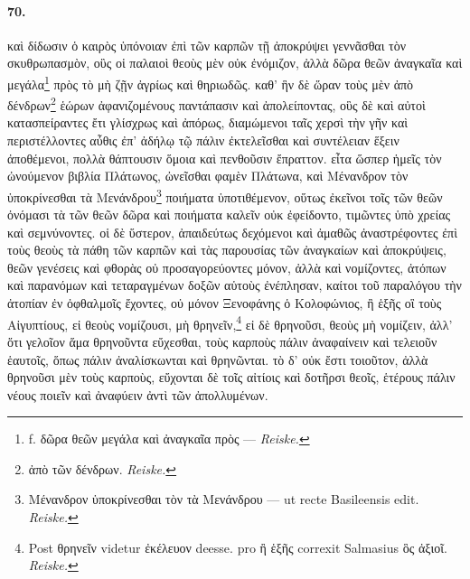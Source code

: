 \documentclass[a4paper, 11pt, oneside, polutonikogreek, german, landscape]{article}
\begin{document}
\paragraph{70.}
καὶ δίδωσιν ὁ καιρὸς ὑπόνοιαν ἐπὶ τῶν καρπῶν τῇ ἀποκρύψει γεννᾶσθαι τὸν σκυθρωπασμὸν, οὓς οἱ παλαιοὶ θεοὺς μὲν οὐκ ἐνόμιζον, ἀλλὰ δῶρα θεῶν ἀναγκαῖα καὶ μεγάλα\footnote{f. δῶρα θεῶν μεγάλα καὶ ἀναγκαῖα πρὸς --- \emph{Reiske.}} πρὸς τὸ μὴ ζῇν ἀγρίως καὶ θηριωδῶς. καθ' ἣν δὲ ὥραν τοὺς μὲν ἀπὸ δένδρων\footnote{ἀπὸ τῶν δένδρων. \emph{Reiske.}} ἑώρων ἀφανιζομένους παντάπασιν καὶ ἀπολείποντας, οὓς δὲ καὶ αὐτοὶ κατασπείραντες ἔτι γλίσχρως καὶ ἀπόρως, διαμώμενοι ταῖς χερσὶ τὴν γῆν καὶ περιστέλλοντες αὖθις ἐπ' ἀδήλῳ τῷ πάλιν ἐκτελεῖσθαι καὶ συντέλειαν ἕξειν ἀποθέμενοι, πολλὰ θάπτουσιν ὅμοια καὶ πενθοῦσιν ἔπραττον. εἶτα ὥσπερ ἡμεῖς τὸν ὠνούμενον βιβλία Πλάτωνος, ὠνεῖσθαι φαμὲν Πλάτωνα, καὶ Μένανδρον τὸν ὑποκρίνεσθαι τὰ Μενάνδρου\footnote{Μένανδρον ὑποκρίνεσθαι τὸν τὰ Μενάνδρου --- ut recte Basileensis edit. \emph{Reiske.}} ποιήματα ὑποτιθέμενον, οὕτως ἐκεῖνοι τοῖς τῶν θεῶν ὀνόμασι τὰ τῶν θεῶν δῶρα καὶ ποιήματα καλεῖν οὐκ ἐφείδοντο, τιμῶντες ὑπὸ χρείας καὶ σεμνύνοντες. οἱ δὲ ὕστερον, ἀπαιδεύτως δεχόμενοι καὶ ἀμαθῶς ἀναστρέφοντες ἐπὶ τοὺς θεοὺς τὰ πάθη τῶν καρπῶν καὶ τὰς παρουσίας τῶν ἀναγκαίων καὶ ἀποκρύψεις, θεῶν γενέσεις καὶ φθορὰς οὐ προσαγορεύοντες μόνον, ἀλλὰ καὶ νομίζοντες, ἀτόπων καὶ παρανόμων καὶ τεταραγμένων δοξῶν αὑτοὺς ἐνέπλησαν, καίτοι τοῦ παραλόγου τὴν ἀτοπίαν ἐν ὀφθαλμοῖς ἔχοντες, οὐ μόνον Ξενοφάνης ὁ Κολοφώνιος, ἢ ἑξῆς οἳ τοὺς Αἰγυπτίους, εἰ θεοὺς νομίζουσι, μὴ θρηνεῖν,\footnote{Post θρηνεῖν videtur ἐκέλευον deesse. pro ἢ ἑξῆς correxit Salmasius ὃς ἀξιοῖ. \emph{Reiske.}} εἰ δὲ θρηνοῦσι, θεοὺς μὴ νομίζειν, ἀλλ' ὅτι γελοῖον ἅμα θρηνοῦντα εὔχεσθαι, τοὺς καρποὺς πάλιν ἀναφαίνειν καὶ τελειοῦν ἑαυτοῖς, ὅπως πάλιν ἀναλίσκωνται καὶ θρηνῶνται. τὸ δ' οὐκ ἔστι τοιοῦτον, ἀλλὰ θρηνοῦσι μὲν τοὺς καρποὺς, εὔχονται δὲ τοῖς αἰτίοις καὶ δοτῆρσι θεοῖς, ἑτέρους πάλιν νέους ποιεῖν καὶ ἀναφύειν ἀντὶ τῶν ἀπολλυμένων.
\end{document}
